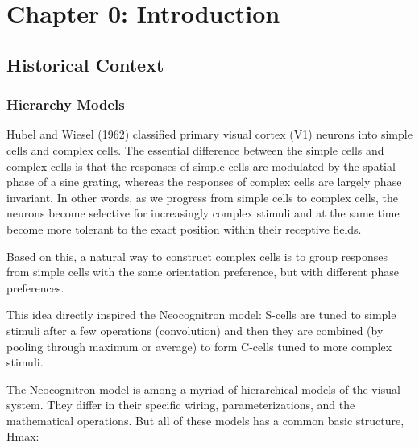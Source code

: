 \chapter{Chapter 0: Introduction} 
\label{Chapter0} 

\section{Historical Context}

\subsection{Hierarchy Models}

\par Hubel and Wiesel (1962) classified primary visual cortex (V1) neurons into simple cells and complex cells. The essential difference between the simple cells and complex cells is that the responses of simple cells are modulated by the spatial phase of a sine grating, whereas the responses of complex cells are largely phase invariant. In other words, as we progress from simple cells to complex cells, the neurons become selective for increasingly complex stimuli and at the same time become more tolerant to the exact position within their receptive fields. 

\par Based on this, a natural way to construct complex cells is to group responses from simple cells with the same orientation preference, but with different phase preferences.

\par This idea directly inspired the Neocognitron model:  S-cells are tuned to simple stimuli after a few operations (convolution) and then they are combined (by pooling through maximum or average) to form C-cells tuned to more complex stimuli. 

\par The Neocognitron model is among a myriad of hierarchical models of the visual system. They differ in their specific wiring, parameterizations, and the mathematical operations. But all of these models has a common basic structure, Hmax:

